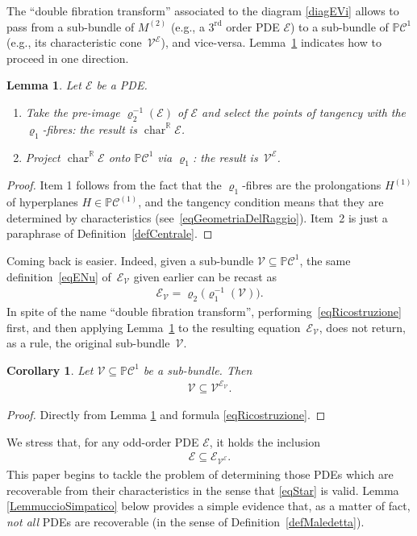 \documentclass[10pt,a4paper]{amsart}
\newcommand{\R}{\mathbb{R}}
\newcommand{\C}{\mathcal{C}}
\newcommand{\M}{\mathcal{V}}
\newcommand{\E}{\mathcal{E}}
\newcommand{\V}{{\mathcal{V}}}
\renewcommand{\P}{\mathbb{P}}
\newcommand{\Char}[1]{\operatorname{char}^\R_{#1}}
\newcommand{\Rd}{^\textrm{rd}}
\newcommand{\p}{\varrho}
\numberwithin{equation}{section}
\newtheorem{Corollary}[Theorem]{Corollary}
\newtheorem{Lemma}[Theorem]{Lemma}
\begin{document}
The ``double f\/ibration transform'' associated to the diagram \eqref{diagEVi} allows to pass from a sub-bundle of $M^{(2)}$ (e.g., a $3\Rd$ order PDE $\E$) to a sub-bundle of $\P\C^1$ (e.g., its characteristic cone~$\M^\E$), and vice-versa. Lemma~\ref{lemFlagCharCone} indicates how to proceed in one direction.

\begin{Lemma}\label{lemFlagCharCone}
Let $\E$ be a PDE.
\begin{enumerate}\itemsep=0pt
\item[$1.$] Take the pre-image $\p_2^{-1}(\E)$ of $\E$ and select the points of tangency with the $\p_1$-fibres: the result is $\Char{}{\E}$.
\item[$2.$] Project $\Char{}{\E}$ onto $\P\C^1$ via $\p_1$: the result is~$\M^\E$.
\end{enumerate}
\end{Lemma}

\begin{proof}
 Item 1 follows from the fact that the $\p_1$-f\/ibres are the prolongations $H^{(1)}$ of hyperplanes $H\in\P\C^{(1)}$, and the tangency condition means that they are determined by characteristics (see~\eqref{eqGeometriaDelRaggio}). Item~2 is just a paraphrase of Def\/inition~\ref{defCentrale}.
\end{proof}
Coming back is easier. Indeed, given a sub-bundle $\M\subseteq\P\C^1$, the same def\/inition~\eqref{eqENu} of~$\E_\M$ given earlier can be recast as
 \begin{gather}\label{eqRicostruzione}
\E_\M=\p_2\big(\p_1^{-1}(\M)\big).
\end{gather}
In spite of the name ``double f\/ibration transform'', performing~\eqref{eqRicostruzione} f\/irst, and then applying Lemma~\ref{lemFlagCharCone} to the resulting equation~$\E_\M$, does not return, as a rule, the original sub-bundle~$\V$.
\begin{Corollary}\label{ColloarioCheServiraPrimaOPoi}
 Let $\M\subseteq\P\C^1$ be a sub-bundle. Then
\begin{gather}\label{eq.cuore}
\M\subseteq\M^{\E_\M}.
\end{gather}
\end{Corollary}
\begin{proof}
 Directly from Lemma \ref{lemFlagCharCone} and formula \eqref{eqRicostruzione}.
\end{proof}

We stress that, for any odd-order PDE $\E$, it holds the inclusion
\begin{gather}
\E\subseteq \E_{\M^\E}.\label{eqcuoricino}
\end{gather}
This paper begins to tackle the problem of determining those PDEs which are recoverable from their characteristics in the sense that \eqref{eqStar} is valid. Lemma \ref{LemmuccioSimpatico} below provides a simple evidence that, as a matter of fact, \emph{not all} PDEs are {recoverable} (in the sense of Def\/inition~\ref{defMaledetta}).
\end{document}
